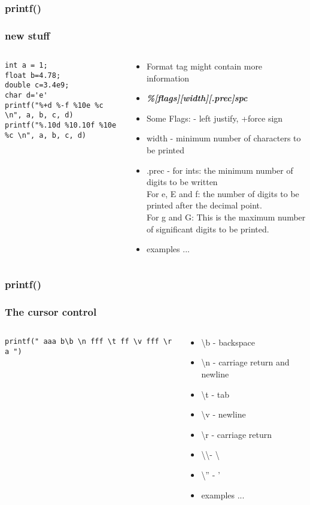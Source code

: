 \documentclass[10pt]{beamer}
\begin{document}
\begin{frame}[fragile]
  \frametitle{printf()}
  \frametitle{new stuff}
  \begin{columns}
    \begin{column}{0.5\textwidth}
\begin{lstlisting}
int a = 1;
float b=4.78;
double c=3.4e9;
char d='e'
printf("%+d %-f %10e %c \n", a, b, c, d)
printf("%.10d %10.10f %10e %c \n", a, b, c, d)
\end{lstlisting}
    \end{column}
    \begin{column}{0.52\textwidth}
      \begin{itemize}
        \item Format tag might contain more information
        \item \textit{\bf{\%[flags][width][.prec]spc}}
        \item Some Flags: - left justify, +force sign
        \item width - minimum number of characters to be printed
        \item .prec - for ints: the minimum number of digits to be written\\
        For e, E and f: the number of digits to be printed after the decimal point.\\
        For g and G: This is the maximum number of significant digits to be printed.
        \item examples ...
      \end{itemize}
    \end{column}
  \end{columns}
\end{frame}

\begin{frame}[fragile]
  \frametitle{printf()}
  \frametitle{The cursor control}
  \begin{columns}
    \begin{column}{0.5\textwidth}
\begin{lstlisting}
printf(" aaa b\b \n fff \t ff \v fff \r a ")
\end{lstlisting}
    \end{column}
    \begin{column}{0.52\textwidth}
      \begin{itemize}
        \item \textbackslash b - backspace
        \item \textbackslash n - carriage return and newline
        \item \textbackslash t - tab
        \item \textbackslash v - newline
        \item \textbackslash r - carriage return
        \item \textbackslash \textbackslash - \textbackslash
        \item \textbackslash '' - '
        \item examples ...
      \end{itemize}
    \end{column}
  \end{columns}
\end{frame}
\end{document}
